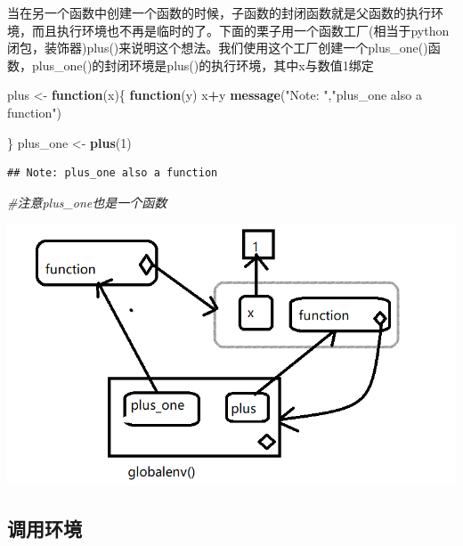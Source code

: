 \documentclass[]{book}
\newenvironment{Shaded}{\begin{snugshade}}{\end{snugshade}}
\newcommand{\KeywordTok}[1]{\textcolor[rgb]{0.13,0.29,0.53}{\textbf{#1}}}
\newcommand{\DecValTok}[1]{\textcolor[rgb]{0.00,0.00,0.81}{#1}}
\newcommand{\StringTok}[1]{\textcolor[rgb]{0.31,0.60,0.02}{#1}}
\newcommand{\CommentTok}[1]{\textcolor[rgb]{0.56,0.35,0.01}{\textit{#1}}}
\newcommand{\ControlFlowTok}[1]{\textcolor[rgb]{0.13,0.29,0.53}{\textbf{#1}}}
\newcommand{\OperatorTok}[1]{\textcolor[rgb]{0.81,0.36,0.00}{\textbf{#1}}}
\newcommand{\NormalTok}[1]{#1}
\begin{document}
当在另一个函数中创建一个函数的时候，子函数的封闭函数就是父函数的执行环境，而且执行环境也不再是临时的了。下面的栗子用一个函数工厂(相当于python闭包，装饰器)plus()来说明这个想法。我们使用这个工厂创建一个plus\_one()函数，plus\_one()的封闭环境是plus()的执行环境，其中x与数值1绑定

\begin{Shaded}
\begin{Highlighting}[]
\NormalTok{plus <-}\StringTok{ }\ControlFlowTok{function}\NormalTok{(x)\{}
  \ControlFlowTok{function}\NormalTok{(y) x}\OperatorTok{+}\NormalTok{y}
  \KeywordTok{message}\NormalTok{(}\StringTok{"Note: "}\NormalTok{,}\StringTok{"plus_one also a function"}\NormalTok{)}
  
\NormalTok{\}}
\NormalTok{plus_one <-}\StringTok{ }\KeywordTok{plus}\NormalTok{(}\DecValTok{1}\NormalTok{)}
\end{Highlighting}
\end{Shaded}

\begin{verbatim}
## Note: plus_one also a function
\end{verbatim}

\begin{Shaded}
\begin{Highlighting}[]
\CommentTok{#注意plus_one也是一个函数}
\end{Highlighting}
\end{Shaded}

\begin{center}\includegraphics{img/ch7-13} \end{center}

\subsection{调用环境}
\end{document}
